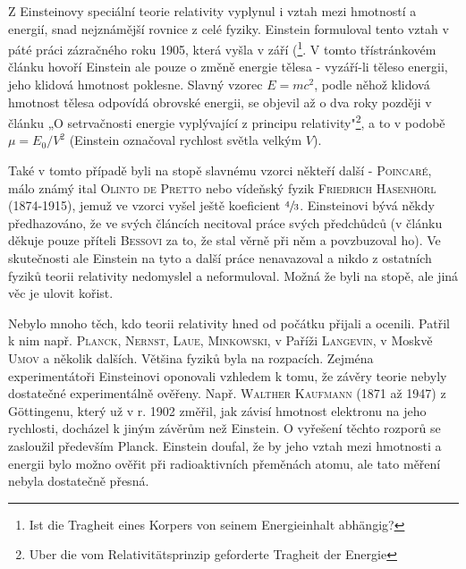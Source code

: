         Z Einsteinovy speciální teorie relativity vyplynul i vztah mezi hmotností a energií, snad
        nejznámější rovnice z celé fyziky. Einstein formuloval tento vztah v páté práci zázračného
        roku 1905, která vyšla v září (\emph{}\footnote{Ist die Tragheit eines Korpers von seinem Energieinhalt abhängig?}. V
        tomto třístránkovém článku hovoří Einstein ale pouze o změně energie tělesa - vyzáří-li
        těleso energii, jeho klidová hmotnost poklesne. Slavný vzorec \(E = mc^2\), podle něhož
        klidová hmotnost tělesa odpovídá obrovské energii, se objevil až o dva roky později v článku
        „O setrvačnosti energie vyplývající z principu relativity"\footnote{Uber die vom
        Relativitätsprinzip geforderte Tragheit der Energie}, a to v podobě \(\mu = E_0/V^2\)
        (Einstein označoval rychlost světla velkým \(V\)).

        \begin{tcnote}
          Také v tomto případě byli na stopě slavnému vzorci někteří další - \textsc{Poincaré}, málo
          známý ital \textsc{Olinto de Pretto} nebo vídeňský fyzik \textsc{Friedrich Hasenhörl}
          (1874-1915), jemuž ve vzorci vyšel ještě koeficient \(\sfrac{4}{3}\). Einsteinovi bývá
          někdy předhazováno, že ve svých článcích necitoval práce svých předchůdců (v článku
          \emph{} děkuje pouze příteli \textsc{Bessovi} za to, že stal věrně
          při něm a povzbuzoval ho). Ve skutečnosti ale Einstein na tyto a další práce nenavazoval a
          nikdo z ostatních fyziků teorii relativity nedomyslel a neformuloval. Možná že byli na
          stopě, ale jiná věc je ulovit kořist.
        \end{tcnote}
        
        Nebylo mnoho těch, kdo teorii relativity hned od počátku přijali a ocenili. Patřil k nim
        např. \textsc{Planck}, \textsc{Nernst}, \textsc{Laue}, \textsc{Minkowski}, v Paříži
        \textsc{Langevin}, v Moskvě \textsc{Umov} a několik dalších. Většina fyziků byla na
        rozpacích. Zejména experimentátoři Einsteinovi oponovali vzhledem k tomu, že závěry teorie
        nebyly dostatečné experimentálně ověřeny. Např. \textsc{Walther Kaufmann} (1871 až 1947) z
        Göttingenu, který už v r. 1902 změřil, jak závisí hmotnost elektronu na jeho rychlosti,
        docházel k jiným závěrům než Einstein. O vyřešení těchto rozporů se zasloužil především
        Planck. Einstein doufal, že by jeho vztah mezi hmotnosti a energii bylo možno ověřit při
        radioaktivních přeměnách atomu, ale tato měření nebyla dostatečně přesná.

